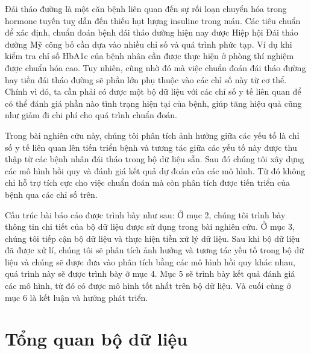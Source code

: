\documentclass[runningheads]{llncs}
\begin{document}
Đái tháo đường là một căn bệnh liên quan đến sự rối loạn chuyển hóa trong hormone tuyến tuỵ dẫn đến thiếu hụt lượng insuline trong máu. Các tiêu chuẩn để xác định, chuẩn đoán bệnh đái tháo đường hiện nay được Hiệp hội Đái tháo đường Mỹ công bố cần dựa vào nhiều chỉ số và quá trình phức tạp. Ví dụ khi kiểm tra chỉ số HbA1c của bệnh nhân cần được thực hiện ở phòng thí nghiệm được chuẩn hóa cao. Tuy nhiên, cũng nhờ đó mà việc chuẩn đoán đái tháo đường hay tiền đái tháo đường sẽ phần lớn phụ thuộc vào các chỉ số này từ cơ thể. 
Chính vì đó, ta cần phải có được một bộ dữ liệu với các chỉ số y tế liên quan để có thể đánh giá phần nào tình trạng hiện tại của bệnh, giúp tăng hiệu quả cũng như giảm đi chi phí cho quá trình chuẩn đoán. 

Trong bài nghiên cứu này, chúng tôi phân tích ảnh hưởng giữa các yếu tố là chỉ số y tế liên quan lên tiến triển bệnh và tương tác giữa các yếu tố này được thu thập từ các bệnh nhân đái tháo trong bộ dữ liệu sẵn. Sau đó chúng tôi xây dựng các mô hình hồi quy và đánh giá kết quả dự đoán của các mô hình. Từ đó không chỉ hỗ trợ tích cực cho việc chuẩn đoán mà còn phân tích được tiến triển của bệnh qua các chỉ số trên.

Cấu trúc bài báo cáo được trình bày như sau: Ở mục 2, chúng tôi trình bày thông tin chi tiết của bộ dữ liệu được sử dụng trong bài nghiên cứu. Ở mục 3, chúng tôi tiếp cận bộ dữ liệu và thực hiện tiền xử lý dữ liệu. Sau khi bộ dữ liệu đã được xử lí, chúng tôi sẽ phân tích ảnh hưởng và tương tác yếu tố trong bộ dữ liệu và chúng sẽ được đưa vào phân tích bằng các mô hình hồi quy khác nhau, quá trình này sẽ được trình bày ở mục 4. Mục 5 sẽ trình bày kết quả đánh giá các mô hình, từ đó có được mô hình tốt nhất trên bộ dữ liệu. Và cuối cùng ở mục 6 là kết luận và hướng phát triển.

\section{Tổng quan bộ dữ liệu}
\end{document}
